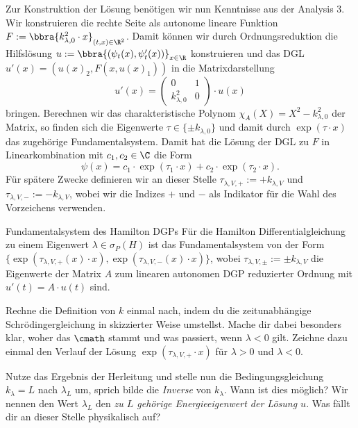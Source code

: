 \documentclass{subfiles}
\begin{document}
        Zur Konstruktion der Lösung benötigen wir nun Kenntnisse aus der Analysis 3. Wir konstruieren die rechte Seite als autonome lineare Funktion $F:=\bbra{k_{\lambda,0}^2\cdot x}_{(t,x)\in\R^2}$. Damit können wir durch Ordnungsreduktion die Hilfslösung $u:=\bbra{(\psi_t(x),\psi_t'(x))}_{x\in\R}$ konstruieren und das DGL $u'(x) = (u(x)_2,F(x,u(x)_1))$ in die Matrixdarstellung 
        \[
            u'(x) = \begin{pmatrix}
                0 & 1 \\
                k_{\lambda,0}^2 & 0
            \end{pmatrix}\cdot u(x)
        \]
        bringen. Berechnen wir das charakteristische Polynom $\chi_A(X) = X^2 - k_{\lambda,0}^2$ der Matrix, so finden sich die Eigenwerte $\tau\in\{\pm k_{\lambda,0}\}$ und damit durch $\exp(\tau\cdot x)$ das zugehörige Fundamentalsystem. Damit hat die Lösung der DGL zu $F$ in Linearkombination mit $c_1,c_2\in\C$ die Form
        \[
            \psi(x) = c_1\cdot \exp(\tau_1\cdot x) + c_2\cdot\exp(\tau_2\cdot x).
        \]
        Für spätere Zwecke definieren wir an dieser Stelle $\tau_{\lambda,V,+}:=+k_{\lambda,V}$ und $\tau_{\lambda,V,-}:=-k_{\lambda,V}$, wobei wir die Indizes $+$ und $-$ als Indikator für die Wahl des Vorzeichens verwenden. 
        \begin{mcor}{Fundamentalsystem des Hamilton DGPs}
            Für die Hamilton Differentialgleichung zu einem Eigenwert $\lambda\in\sigma_P(H)$ ist das Fundamentalsystem von der Form $\{\exp(\tau_{\lambda,V,+}(x)\cdot x),\exp(\tau_{\lambda,V,-}(x)\cdot x)\}$, wobei $\tau_{\lambda,V,\pm} := \pm k_{\lambda,V}$ die Eigenwerte der Matrix $A$ zum linearen autonomen DGP reduzierter Ordnung mit $u'(t) = A\cdot u(t)$ sind. 
        \end{mcor}
        \begin{Aufgabe}
            \nr{} Rechne die Definition von $k$ einmal nach, indem du die zeitunabhängige Schrödingergleichung in skizzierter Weise umstellst. Mache dir dabei besonders klar, woher das $\cmath$ stammt und was passiert, wenn $\lambda < 0$ gilt. Zeichne dazu einmal den Verlauf der Lösung $\exp(\tau_{\lambda,V,+}\cdot x)$ für $\lambda > 0$ und $\lambda < 0$.


            \nr{} Nutze das Ergebnis der Herleitung und stelle nun die Bedingungsgleichung $k_\lambda = L$ nach $\lambda_L$ um, sprich bilde die \emph{Inverse} von $k_\lambda$. Wann ist dies möglich? Wir nennen den Wert $\lambda_L$ den \emph{zu $L$ gehörige Energieeigenwert der Lösung $u$}. Was fällt dir an dieser Stelle physikalisch auf? 
        \end{Aufgabe}
\end{document}
